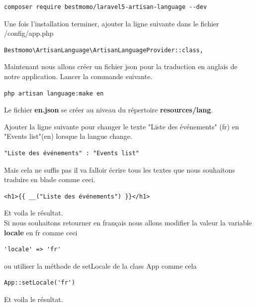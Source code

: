 \documentclass[12pt,a4paper]{article}
\begin{document}
\begin{verbatim}
composer require bestmomo/laravel5-artisan-language --dev
\end{verbatim}

Une fois l'installation terminer, ajouter la ligne suivante dans le fichier /config/app.php
\begin{verbatim}
Bestmomo\ArtisanLanguage\ArtisanLanguageProvider::class,
\end{verbatim}

Maintenant nous allons créer un fichier json pour la traduction en anglais de notre application.
Lancer la commande suivante.

\begin{verbatim}
php artisan language:make en
\end{verbatim}

Le fichier \textbf{en.json} se créer au niveau du répertoire \textbf{resources/lang}.

Ajouter la ligne suivante pour changer le texte "Liste des événements" (fr) en "Events list"(en) lorsque
la langue change.

\begin{verbatim}
"Liste des événements" : "Events list"
\end{verbatim}

Mais cela ne suffis pas il va falloir écrire tous les textes que nous souhaitons traduire en blade
comme ceci.
\begin{verbatim}
<h1>{{ __("Liste des événements") }}</h1>
\end{verbatim}

Et voila le résultat.\\

Si nous souhaitons retourner en français nous allons modifier la valeur la variable \textbf{locale} en
fr comme ceci
\begin{verbatim}
'locale' => 'fr' 
\end{verbatim}
ou utiliser la méthode de setLocale de la class App  comme cela
\begin{verbatim}
App::setLocale('fr')
\end{verbatim}

Et voila le résultat.\\
\end{document}
